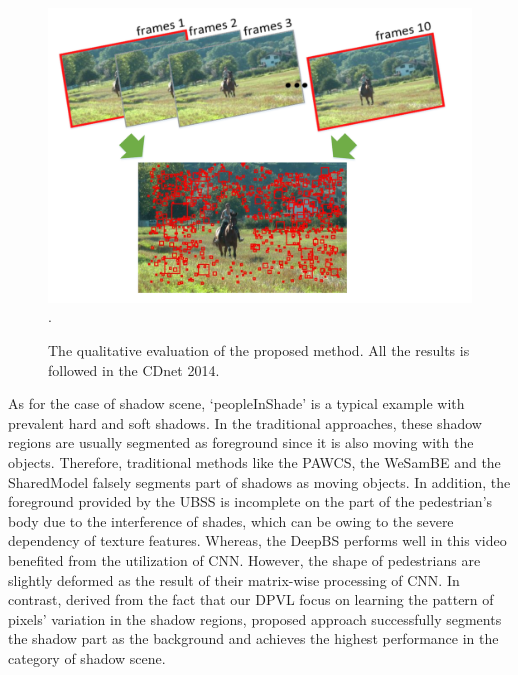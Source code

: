 \documentclass[journal]{IEEEtran}
\begin{document}
\begin{figure}[!t]	\centering
    \includegraphics[width=\textwidth]{figure/fig3}
\DeclareGraphicsExtensions.
    \caption{The qualitative evaluation of the proposed method. All the results is followed in the CDnet 2014.}
    \label{results_chart}
\end{figure}
As for the case of shadow scene, ‘peopleInShade’ is a typical example with prevalent hard and soft shadows. 
In the traditional approaches, these shadow regions are usually segmented as foreground since it is also moving with the objects. 
Therefore, traditional methods like the PAWCS, the WeSamBE and the SharedModel falsely segments part of shadows as moving objects. 
In addition, the foreground provided by the UBSS is incomplete on the part of the pedestrian’s body due to the interference of shades, which can be owing to the severe dependency of texture features. 
Whereas, the DeepBS performs well in this video benefited from the utilization of CNN. 
However, the shape of pedestrians are slightly deformed as the result of their matrix-wise processing of CNN. 
In contrast, derived from the fact that our DPVL focus on learning the pattern of pixels’ variation in the shadow regions, proposed approach successfully segments the shadow part as the background and achieves the highest performance in the category of shadow scene.
\end{document}
